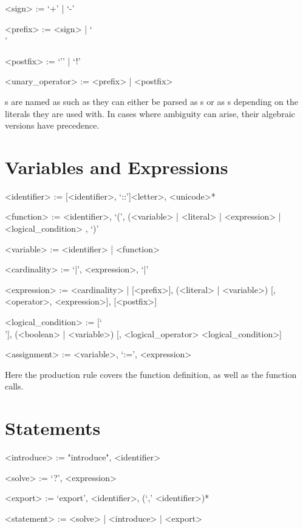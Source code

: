 \documentclass[11pt,a4paper]{book}
\begin{document}
\begin{grammar}
<sign> := `+' | `-'

<prefix> := <sign> | `\\'

<postfix> := `'' | `!'

<unary\_operator> := <prefix> | <postfix>
\end{grammar}


s are named as such as they can either be parsed as s or as s depending on the literals they are used with. In cases where ambiguity can arise, their algebraic versions have precedence.

\section{Variables and Expressions}

\begin{grammar}
<identifier> := [<identifier>, `::']<letter>, <unicode>*

<function> := <identifier>, `(', (<variable> | <literal> | <expression> | <logical\_condition> , `)'

<variable> := <identifier> | <function>

<cardinality> := `|', <expression>, `|'

<expression> := <cardinality> | [<prefix>], (<literal> | <variable>) [, <operator>, <expression>], [<postfix>]

<logical\_condition> := [`\\'], (<boolean> | <variable>) [, <logical\_operator> <logical\_condition>]

<assignment> := <variable>, `:=', <expression>
\end{grammar}

Here the  production rule covers the function definition, as well as the function calls.

\section{Statements}

\begin{grammar}

<introduce> := "introduce", <identifier>

<solve> := `?', <expression>

<export> := `export', <identifier>, (`,' <identifier>)*

<statement> := <solve> | <introduce> | <export>

\end{grammar}
\end{document}
